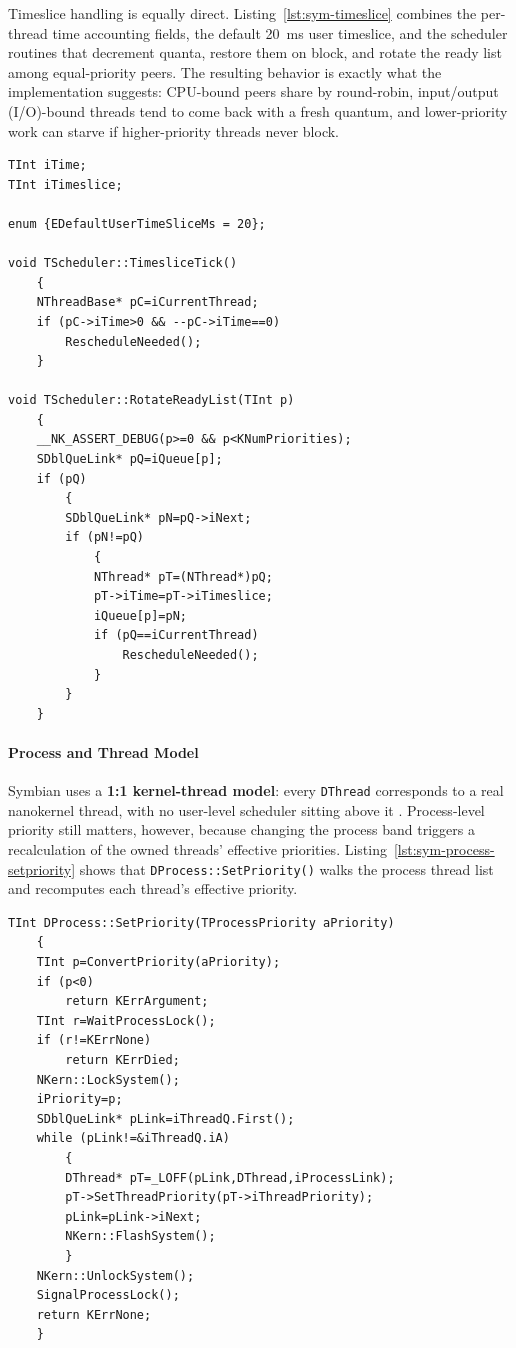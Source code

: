 Timeslice handling is equally direct. Listing~\ref{lst:sym-timeslice} combines
the per-thread time accounting fields, the default 20~ms user timeslice, and
the scheduler routines that decrement quanta, restore them on block, and rotate
the ready list among equal-priority peers. The resulting behavior is exactly
what the implementation suggests: CPU-bound peers share by round-robin,
input/output (I/O)-bound threads tend to come back with a fresh quantum, and
lower-priority work can starve if higher-priority threads never block.

\begin{listing}[H]
\begin{verbatim}
TInt iTime;
TInt iTimeslice;

enum {EDefaultUserTimeSliceMs = 20};

void TScheduler::TimesliceTick()
	{
	NThreadBase* pC=iCurrentThread;
	if (pC->iTime>0 && --pC->iTime==0)
		RescheduleNeeded();
	}

void TScheduler::RotateReadyList(TInt p)
	{
	__NK_ASSERT_DEBUG(p>=0 && p<KNumPriorities);
	SDblQueLink* pQ=iQueue[p];
	if (pQ)
		{
		SDblQueLink* pN=pQ->iNext;
		if (pN!=pQ)
			{
			NThread* pT=(NThread*)pQ;
			pT->iTime=pT->iTimeslice;
			iQueue[p]=pN;
			if (pQ==iCurrentThread)
				RescheduleNeeded();
			}
		}
	}
\end{verbatim}
\caption{Timeslice state and round-robin rotation. Files:
\texttt{nk\_priv.h}, \texttt{kern\_priv.h}, and \texttt{nkern/sched.cpp}.}
\label{lst:sym-timeslice}
\end{listing}

\paragraph{Process and Thread Model}

Symbian uses a \textbf{1:1 kernel-thread model}: every \texttt{DThread}
corresponds to a real nanokernel thread, with no user-level scheduler sitting
above it \citep{symbian_eka2_kernel}. Process-level priority still matters,
however, because changing the process band triggers a recalculation of the
owned threads' effective priorities. Listing~\ref{lst:sym-process-setpriority}
shows that \texttt{DProcess::SetPriority()} walks the process thread list and
recomputes each thread's effective priority.

\begin{listing}[H]
\begin{verbatim}
TInt DProcess::SetPriority(TProcessPriority aPriority)
	{
	TInt p=ConvertPriority(aPriority);
	if (p<0)
		return KErrArgument;
	TInt r=WaitProcessLock();
	if (r!=KErrNone)
		return KErrDied;
	NKern::LockSystem();
	iPriority=p;
	SDblQueLink* pLink=iThreadQ.First();
	while (pLink!=&iThreadQ.iA)
		{
		DThread* pT=_LOFF(pLink,DThread,iProcessLink);
		pT->SetThreadPriority(pT->iThreadPriority);
		pLink=pLink->iNext;
		NKern::FlashSystem();
		}
	NKern::UnlockSystem();
	SignalProcessLock();
	return KErrNone;
	}
\end{verbatim}
\caption{Process-priority propagation in \texttt{sprocess.cpp}.}
\label{lst:sym-process-setpriority}
\end{listing}

